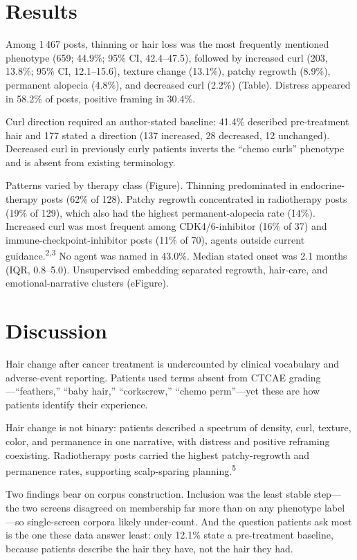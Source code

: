 \documentclass[11pt]{article}
\begin{document}
\section*{Results}
Among 1\,467 posts, thinning or hair loss was the most frequently mentioned phenotype (659; 44.9\%; 95\% CI, 42.4--47.5), followed by increased curl (203, 13.8\%; 95\% CI, 12.1--15.6), texture change (13.1\%), patchy regrowth (8.9\%), permanent alopecia (4.8\%), and decreased curl (2.2\%) (Table). Distress appeared in 58.2\% of posts, positive framing in 30.4\%.

Curl direction required an author-stated baseline: 41.4\% described pre-treatment hair and 177 stated a direction (137 increased, 28 decreased, 12 unchanged). Decreased curl in previously curly patients inverts the ``chemo curls'' phenotype and is absent from existing terminology.

Patterns varied by therapy class (Figure). Thinning predominated in endocrine-therapy posts (62\% of 128). Patchy regrowth concentrated in radiotherapy posts (19\% of 129), which also had the highest permanent-alopecia rate (14\%). Increased curl was most frequent among CDK4/6-inhibitor (16\% of 37) and immune-checkpoint-inhibitor posts (11\% of 70), agents outside current guidance.\textsuperscript{2,3} No agent was named in 43.0\%. Median stated onset was 2.1 months (IQR, 0.8--5.0). Unsupervised embedding separated regrowth, hair-care, and emotional-narrative clusters (eFigure).

\section*{Discussion}
Hair change after cancer treatment is undercounted by clinical vocabulary and adverse-event reporting. Patients used terms absent from CTCAE grading---``feathers,'' ``baby hair,'' ``corkscrew,'' ``chemo perm''---yet these are how patients identify their experience.

Hair change is not binary: patients described a spectrum of density, curl, texture, color, and permanence in one narrative, with distress and positive reframing coexisting. Radiotherapy posts carried the highest patchy-regrowth and permanence rates, supporting scalp-sparing planning.\textsuperscript{5}

Two findings bear on corpus construction. Inclusion was the least stable step---the two screens disagreed on membership far more than on any phenotype label---so single-screen corpora likely under-count. And the question patients ask most is the one these data answer least: only 12.1\% state a pre-treatment baseline, because patients describe the hair they have, not the hair they had.
\end{document}
